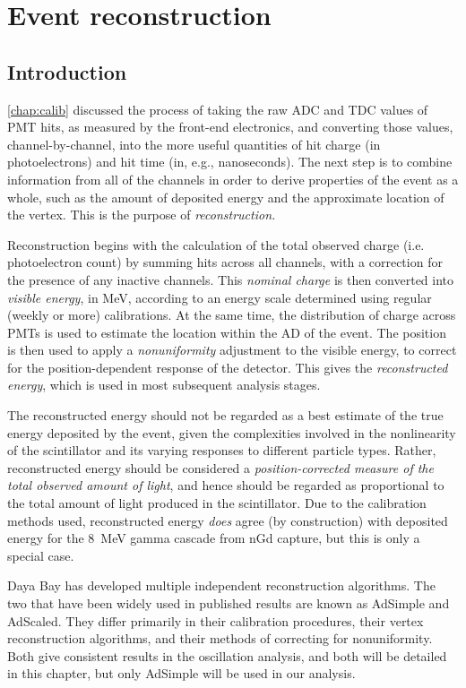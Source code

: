 \documentclass[../thesis.tex]{subfiles}
\begin{document}
\chapter{Event reconstruction}
\label{chap:recon}

\section{Introduction}

\autoref{chap:calib} discussed the process of taking the raw ADC and TDC values
of PMT hits, as measured by the front-end electronics, and converting those
values, channel-by-channel, into the more useful quantities of hit charge (in
photoelectrons) and hit time (in, e.g., nanoseconds). The next step is to
combine information from all of the channels in order to derive properties of
the event as a whole, such as the amount of deposited energy and the approximate
location of the vertex. This is the purpose of \emph{reconstruction.}

Reconstruction begins with the calculation of the total observed charge
(i.e. photoelectron count) by summing hits across all channels, with a
correction for the presence of any inactive channels. This \emph{nominal charge}
is then converted into \emph{visible energy}, in MeV, according to an energy
scale determined using regular (weekly or more) calibrations. At the same time,
the distribution of charge across PMTs is used to estimate the location within
the AD of the event. The position is then used to apply a \emph{nonuniformity}
adjustment to the visible energy, to correct for the position-dependent response
of the detector. This gives the \emph{reconstructed energy}, which is used in
most subsequent analysis stages.

The reconstructed energy should not be regarded as a best estimate of the true
energy deposited by the event, given the complexities involved in the
nonlinearity of the scintillator and its varying responses to different particle
types. Rather, reconstructed energy should be considered a
\emph{position-corrected measure of the total observed amount of light}, and
hence should be regarded as proportional to the total amount of light produced
in the scintillator. Due to the calibration methods used, reconstructed energy
\emph{does} agree (by construction) with deposited energy for the 8~MeV gamma
cascade from nGd capture, but this is only a special case.

Daya Bay has developed multiple independent reconstruction algorithms. The two
that have been widely used in published results are known as AdSimple and
AdScaled. They differ primarily in their calibration procedures, their vertex
reconstruction algorithms, and their methods of correcting for
nonuniformity. Both give consistent results in the oscillation analysis, and
both will be detailed in this chapter, but only AdSimple will be used in our
analysis.
\end{document}
